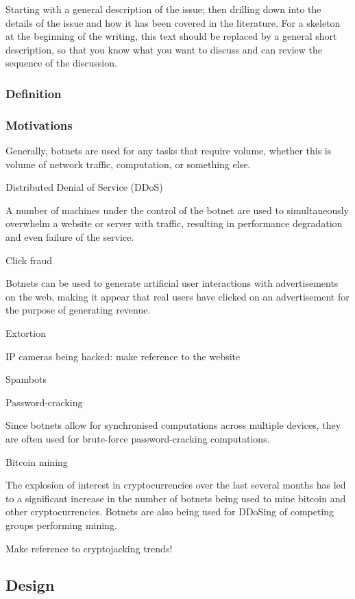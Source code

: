 Starting with a general description of the issue; then drilling down into the details of the issue and how it has been covered in the literature. For a skeleton at the beginning of the writing, this text should be replaced by a general short description, so that you know what you want to discuss and can review the sequence of the discussion.

\subsubsection{Definition}
\subsubsection{Motivations}
Generally, botnets are used for any tasks that require volume, whether this is volume of network traffic, computation, or something else.

\bullet Distributed Denial of Service (DDoS)

A number of machines under the control of the botnet are used to simultaneously overwhelm a website or server with traffic, resulting in performance degradation and even failure of the service.

\bullet Click fraud

Botnets can be used to generate artificial user interactions with advertisements on the web, making it appear that real users have clicked on an advertisement for the purpose of generating revenue.

\bullet Extortion

IP cameras being hacked: make reference to the website

\bullet Spambots

\bullet Password-cracking

Since botnets allow for synchronised computations across multiple devices, they are often used for brute-force password-cracking computations.

\bullet Bitcoin mining

The explosion of interest in cryptocurrencies over the last several months has led to a significant increase in the number of botnets being used to mine bitcoin and other cryptocurrencies. Botnets are also being used for DDoSing of competing groups performing mining.

Make reference to cryptojacking trends!

\subsection{Design}

